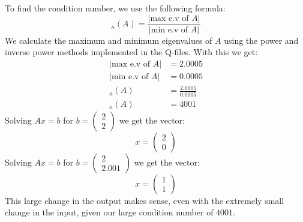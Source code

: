 \iffalse
The condition number can be found by dividing $\lambda_{max}(A)$ with $\lambda_{min}(A)$.
Using the implemented functions, we get the following values:
\begin{align*}
  \lambda_{max}(A) &= 2 \\
  \lambda_{min}(A) &= 2000.5
\end{align*}
With this we get a condition number of $0.00099975006$.
I am not quite sure how to answer the rest of the question, as I don't quite understand what it is asking.
\fi

To find the condition number, we use the following formula:
$$
_\kappa(A) = \frac{|\text{max e.v of }A|}{|\text{min e.v of }A|}
$$
We calculate the maximum and minimum eigenvalues of $A$ using the power and inverse power methods implemented in the Q-files. With this we get:
\begin{align*}
|\text{max e.v of }A| &= 2.0005 \\
|\text{min e.v of }A| &= 0.0005 \\
_\kappa(A) &= \frac{2.0005}{0.0005} \\
_\kappa(A) &= 4001
\end{align*}
Solving $Ax = b$ for $b = \begin{pmatrix} 2 \\ 2 \end{pmatrix}$ we get the vector:
$$
x =
\begin{pmatrix}
2 \\
0
\end{pmatrix}
$$
Solving $Ax = b$ for $b = \begin{pmatrix} 2 \\ 2.001 \end{pmatrix}$ we get the vector:
$$
x =
\begin{pmatrix}
1 \\
1
\end{pmatrix}
$$
This large change in the output makes sense, even with the extremely small change in the input, given our large condition number of $4001$.
